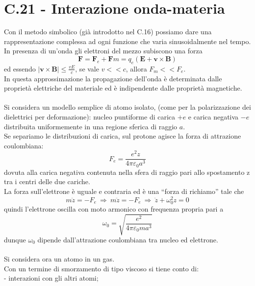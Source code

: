\documentclass{article}
\begin{document}
\section*{C.21 - Interazione onda-materia}
Con il metodo simbolico (già introdotto nel C.16) possiamo dare una rappresentazione complessa ad ogni funzione che varia sinusoidalmente nel tempo.
In presenza di un’onda gli elettroni del mezzo subiscono una forza
\begin{equation}
    \textbf{F}=\textbf{F}_e+\textbf{F}m=q_e(\textbf{E}+\textbf{v}\times\textbf{B})
\nonumber
\end{equation}
ed essendo $|\textbf{v}\times\textbf{B}|\leq\frac{vE}{c}$, se vale $v<<c$, allora $F_m<<F_e$.\\
 In questa approssimazione la propagazione dell’onda è determinata dalle proprietà elettriche del materiale ed è indipendente dalle proprietà magnetiche.\\
 \\
 Si considera un modello semplice di atomo isolato, (come per la polarizzazione dei dielettrici per deformazione): nucleo puntiforme di carica $+e$ e carica negativa $-e$ distribuita uniformemente in una regione sferica di raggio $a$.\\
 Se separiamo le distribuzioni di carica, sul protone agisce la forza di attrazione coulombiana:
\begin{equation}
    F_e=\frac{e^2z}{4\pi\varepsilon_0a^3}
\nonumber
\end{equation}
dovuta alla carica negativa contenuta nella sfera di raggio pari allo spostamento z tra i centri delle due cariche.\\
La forza sull’elettrone è uguale e contraria ed è una “forza di richiamo” tale che 
\begin{equation}
    m\ddot{z}=-F_e \ \Rightarrow \ m\ddot{z}=-F_e \ \Rightarrow \ \ddot{z}+\omega_0^2z=0
\nonumber
\end{equation}
quindi l’elettrone oscilla con moto armonico con frequenza propria pari a
\begin{equation}
    \omega_0=\sqrt{\frac{e^2}{4\pi\varepsilon_0ma^3}}
\nonumber
\end{equation}
dunque $\omega_0$ dipende dall’attrazione coulombiana tra nucleo ed elettrone.\\
\\
Si considera ora un atomo in un gas.\\
Con un termine di smorzamento di tipo viscoso si tiene conto di:\\
- interazioni con gli altri atomi;\\
\end{document}
